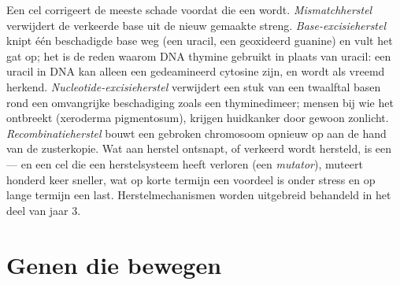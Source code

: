 \begin{proposition}\label{prop:b2:genome-diversification:repair}
Een cel corrigeert de meeste schade voordat die een  wordt.
\emph{Mismatchherstel} verwijdert de verkeerde base uit de nieuw
gemaakte streng. \emph{Base-excisieherstel} knipt één beschadigde base
weg (een uracil, een geoxideerd guanine) en vult het gat op; het is de
reden waarom DNA thymine gebruikt in plaats van uracil: een uracil in
DNA kan alleen een gedeamineerd cytosine zijn, en wordt als vreemd
herkend. \emph{Nucleotide-excisieherstel} verwijdert een stuk van een
twaalftal basen rond een omvangrijke beschadiging zoals een
thyminedimeer; mensen bij wie het ontbreekt (xeroderma pigmentosum),
krijgen huidkanker door gewoon zonlicht.
\emph{Recombinatieherstel} bouwt een gebroken chromosoom opnieuw op aan
de hand van de zusterkopie. Wat aan herstel ontsnapt, of verkeerd wordt
hersteld, is een  --- en een cel die een herstelsysteem heeft
verloren (een \emph{mutator}), muteert honderd keer sneller, wat op
korte termijn een voordeel is onder stress en op lange termijn een last.
Herstelmechanismen worden uitgebreid behandeld in het deel van jaar 3.
\end{proposition}

\section{Genen die bewegen}

